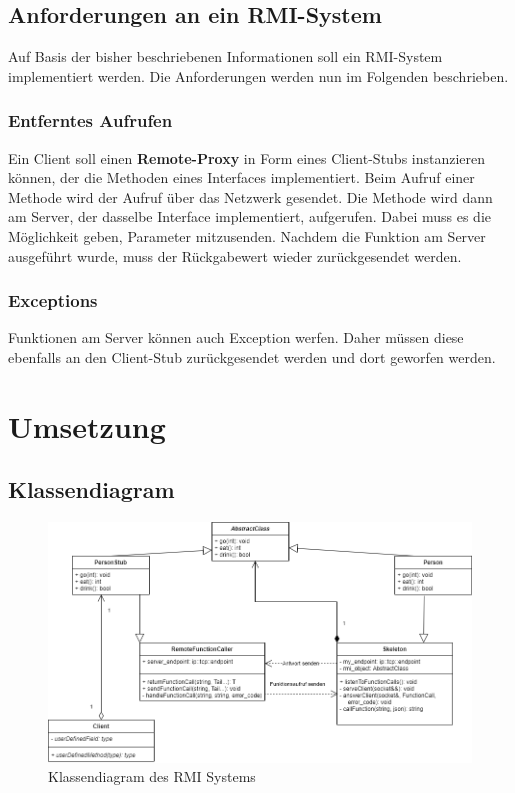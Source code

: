 \documentclass[a4paper,oneside,10pt]{report}
\begin{document}

\section{Anforderungen an ein RMI-System}

Auf Basis der bisher beschriebenen Informationen soll ein RMI-System implementiert werden. Die Anforderungen werden nun im Folgenden beschrieben. 

\subsection{Entferntes Aufrufen}

Ein Client soll einen \textbf{Remote-Proxy} in Form eines Client-Stubs instanzieren können, der die Methoden eines Interfaces implementiert. Beim Aufruf einer Methode wird der Aufruf über das Netzwerk gesendet. Die Methode wird dann am Server, der dasselbe Interface implementiert, aufgerufen. Dabei muss es die Möglichkeit geben, Parameter mitzusenden. Nachdem die Funktion am Server ausgeführt wurde, muss der Rückgabewert wieder zurückgesendet werden.  

\subsection{Exceptions}

Funktionen am Server können auch Exception werfen. Daher müssen diese ebenfalls an den Client-Stub zurückgesendet werden und dort geworfen werden.

\chapter{Umsetzung}

\section{Klassendiagram}

\begin{figure}[h]
\centering
\includegraphics[width=12cm]{class_diagram}
\caption[My Caption]{Klassendiagram des RMI Systems}
\end{figure} 
\end{document}
